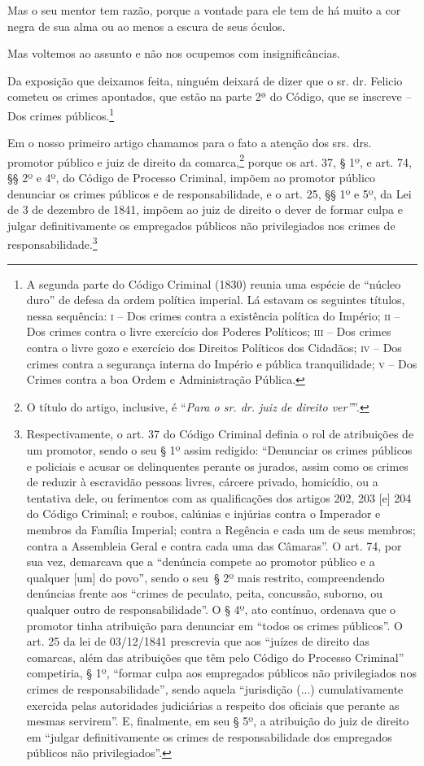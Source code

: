 Mas o seu mentor tem razão, porque a vontade para ele tem de há muito a
cor negra de sua alma ou ao menos a escura de seus óculos.

Mas voltemos ao assunto e não nos ocupemos com insignificâncias.

Da exposição que deixamos feita, ninguém deixará de dizer que o sr. dr.
Felicio cometeu os crimes apontados, que estão na parte 2ª do Código,
que se inscreve -- Dos crimes públicos.\footnote{ A segunda parte do
  Código Criminal (1830) reunia uma espécie de ``núcleo duro'' de defesa
  da ordem política imperial. Lá estavam os seguintes títulos, nessa
  sequência: \textsc{i} -- Dos crimes contra a existência política do Império; \textsc{ii}
  -- Dos crimes contra o livre exercício dos Poderes Políticos; \textsc{iii} --
  Dos crimes contra o livre gozo e exercício dos Direitos Políticos dos
  Cidadãos; \textsc{iv} -- Dos crimes contra a segurança interna do Império e
  pública tranquilidade; \textsc{v} -- Dos Crimes contra a boa Ordem e
  Administração Pública.}

Em o nosso primeiro artigo chamamos para o fato a atenção dos srs. drs.
promotor público e juiz de direito da comarca,\footnote{ O título do
  artigo, inclusive, é ``\emph{Para o sr. dr. juiz de direito ver''}''.}
porque os art. 37, § 1º, e art. 74, §§ 2º e 4º, do Código de Processo
Criminal, impõem ao promotor público denunciar os crimes públicos e de
responsabilidade, e o art. 25, §§ 1º e 5º, da Lei de 3 de dezembro de
1841, impõem ao juiz de direito o dever de formar culpa e julgar
definitivamente os empregados públicos não privilegiados nos crimes de
responsabilidade.\footnote{ Respectivamente, o art. 37 do Código
  Criminal definia o rol de atribuições de um promotor, sendo o seu § 1º
  assim redigido: ``Denunciar os crimes públicos e policiais e acusar os
  delinquentes perante os jurados, assim como os crimes de reduzir à
  escravidão pessoas livres, cárcere privado, homicídio, ou a tentativa
  dele, ou ferimentos com as qualificações dos artigos 202, 203 {[}e{]}
  204 do Código Criminal; e roubos, calúnias e injúrias contra o
  Imperador e membros da Família Imperial; contra a Regência e cada um
  de seus membros; contra a Assembleia Geral e contra cada uma das
  Câmaras''. O art. 74, por sua vez, demarcava que a ``denúncia compete ao
  promotor público e a qualquer {[}um{]} do povo'', sendo o seu~§ 2º mais
  restrito, compreendendo denúncias frente aos ``crimes de peculato,
  peita, concussão, suborno, ou qualquer outro de responsabilidade''. O §
  4º, ato contínuo, ordenava que o promotor tinha atribuição para
  denunciar em ``todos os crimes públicos''. O art. 25 da lei de
  03/12/1841 prescrevia que aos ``juízes de direito das comarcas, além
  das atribuições que têm pelo Código do Processo Criminal'' competiria,
  § 1º, ``formar culpa aos empregados públicos não privilegiados nos
  crimes de responsabilidade'', sendo aquela ``jurisdição (...)
  cumulativamente exercida pelas autoridades judiciárias a respeito dos
  oficiais que perante as mesmas servirem''. E, finalmente, em seu § 5º,
  a atribuição do juiz de direito em ``julgar definitivamente os crimes
  de responsabilidade dos empregados públicos não privilegiados''.}

